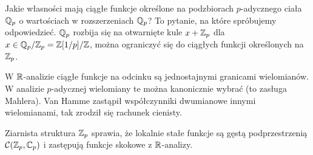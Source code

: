 Jakie własności mają ciągłe funkcje określone na podzbiorach $p$-adycznego ciała $\mathbb Q_p$ o wartościach w rozszerzeniach $\mathbb Q_p$?
To pytanie, na które spróbujemy odpowiedzieć.
$\mathbb Q_p$ rozbija się na otwarnięte kule $x + \mathbb Z_p$ dla $x \in \mathbb Q_p/\mathbb Z_p = \mathbb Z[1/p] / \mathbb Z$, można ograniczyć się do ciągłych funkcji określonych na $\mathbb Z_p$.

W $\mathbb R$-analizie ciągłe funkcje na odcinku są jednostajnymi granicami wielomianów.
W analizie $p$-adycznej wielomiany te można kanonicznie wybrać (to zasługa Mahlera).
Van Hamme zastąpił współczynniki dwumianowe innymi wielomianami, tak zrodził się rachunek cienisty.

Ziarnista struktura $\mathbb Z_p$ sprawia, że lokalnie stałe funkcje są gęstą podprzestrzenią $\mathcal C(\mathbb Z_p, \mathbb C_p)$ i zastępują funkcje skokowe z $\mathbb R$-analizy.